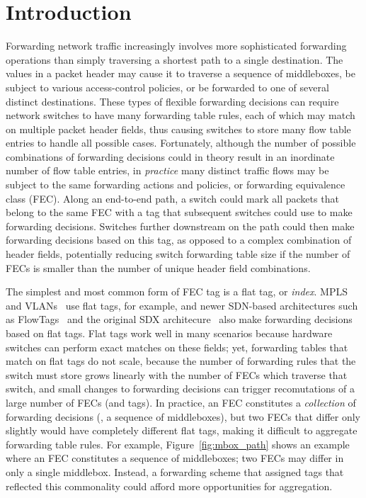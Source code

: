\section{Introduction}
\label{sec:intro}

Forwarding network traffic increasingly involves more sophisticated
forwarding operations than simply traversing a shortest path to a single
destination.  The values in a packet header may cause it to traverse a
sequence of middleboxes, be subject to various access-control policies,
or be forwarded to one of several distinct destinations. These types of
flexible forwarding decisions can require network switches to have many
forwarding table rules, each of which may match on multiple packet
header fields, thus causing switches to store many flow table entries to
handle all possible cases. Fortunately, although the number of possible
combinations of forwarding decisions could in theory result in an
inordinate number of flow table entries, in {\em practice} many distinct
traffic flows may be subject to the same forwarding actions and
policies, or {forwarding equivalence class} (FEC). Along an end-to-end
path, a switch could mark all packets that belong to the same FEC with a
tag that subsequent switches could use to make forwarding
decisions. Switches further downstream on the path could then make
forwarding decisions based on this tag, as opposed to a complex
combination of header fields, potentially reducing switch forwarding
table size if the number of FECs is smaller than the number of unique
header field combinations.

The simplest and most common form of FEC tag is a flat tag, or
\emph{index}.  MPLS~\cite{mpls} and VLANs~\cite{vlan} use flat tags, for
example, and newer SDN-based architectures such as
FlowTags~\cite{flowtags} and the original SDX architecure~\cite{sdx}
also make forwarding decisions based on flat tags.  Flat tags work well
in many scenarios because hardware switches can perform exact matches on
these fields; yet, forwarding tables that match on flat tags do not
scale, because the number of forwarding rules that the switch must store
grows linearly with the number of FECs which traverse that
switch, and small changes to forwarding decisions can trigger
recomutations of a large number of FECs (and tags).
In practice, an FEC constitutes a \emph{collection} of
forwarding decisions (\eg, a sequence of middleboxes), but two FECs that
differ only slightly would have completely different flat tags, making it
difficult to aggregate forwarding table rules.  For example,
Figure~\ref{fig:mbox_path} shows an example where an FEC constitutes a
sequence of middleboxes; two FECs may differ in only a single
middlebox. Instead, a forwarding scheme that assigned tags that
reflected this commonality could afford more opportunities for
aggregation.

